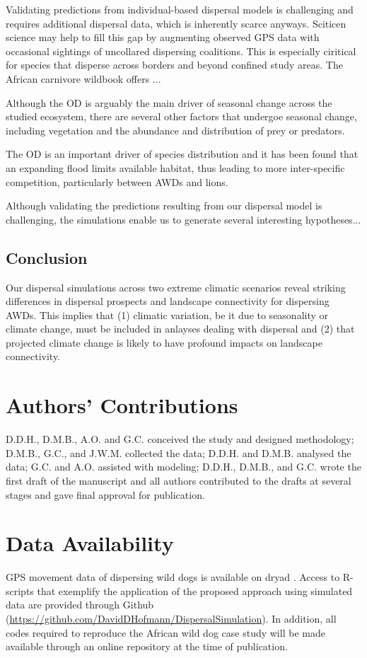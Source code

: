 \documentclass[abstract=on,10pt,a4paper,bibliography=totocnumbered]{article}
\begin{document}
Validating predictions from individual-based dispersal models is challenging and
requires additional dispersal data, which is inherently scarce anyways. Sciticen
science may help to fill this gap by augmenting observed GPS data with
occasional sightings of uncollared dispersing coalitions. This is especially
ciritical for species that disperse across borders and beyond confined study
areas. The African carnivore wildbook offers ...

Although the OD is arguably the main driver of seasonal change across the
studied ecosystem, there are several other factors that undergoe seasonal
change, including vegetation and the abundance and distribution of prey or
predators.

The OD is an important driver of species distribution and it has been found that
an expanding flood limits available habitat, thus leading to more inter-specific
competition, particularly between AWDs and lions.

Although validating the predictions resulting from our dispersal model is
challenging, the simulations enable us to generate several interesting
hypotheses...

\subsection{Conclusion}
Our dispersal simulations across two extreme climatic scenarios reveal striking
differences in dispersal prospects and landscape connectivity for dispersing
AWDs. This implies that (1) climatic variation, be it due to seasonality or
climate change, must be included in anlayses dealing with dispersal and (2) that
projected climate change is likely to have profound impacts on landscape
connectivity.

\section{Authors' Contributions}
D.D.H., D.M.B., A.O. and G.C. conceived the study and designed methodology;
D.M.B., G.C., and J.W.M. collected the data; D.D.H. and D.M.B. analysed the
data; G.C. and A.O. assisted with modeling; D.D.H., D.M.B., and G.C. wrote the
first draft of the manuscript and all authors contributed to the drafts at
several stages and gave final approval for publication.

\section{Data Availability}
GPS movement data of dispersing wild dogs is available on dryad
\citep{Hofmann.2021b}. Access to R-scripts that exemplify the application of the
proposed approach using simulated data are provided through Github
(\url{https://github.com/DavidDHofmann/DispersalSimulation}). In addition, all
codes required to reproduce the African wild dog case study will be made
available through an online repository at the time of publication.
\end{document}

